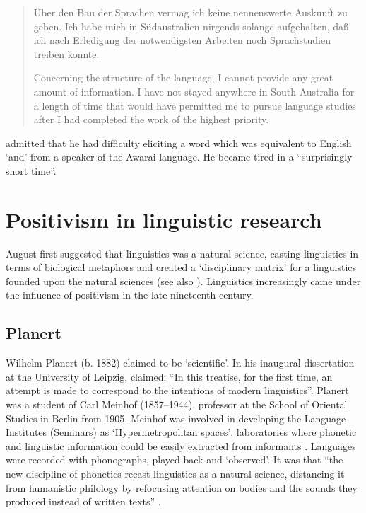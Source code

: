 \documentclass[english,output=paper,colorlinks,citecolor=brown]{../langscibook}
\begin{document}
\begin{quote}
    Über den Bau der Sprachen vermag ich keine nennenswerte Auskunft zu geben. Ich habe mich in Südaustralien nirgends solange aufgehalten, daß ich nach Erledigung der notwendigsten Arbeiten noch Sprachstudien treiben konnte. 

    Concerning the structure of the language, I cannot provide any great amount of information. I have not stayed anywhere in South Australia for a length of time that would have permitted me to pursue language studies after I had completed the work of the highest priority. \citep[81]{Eylmann1908}
\end{quote}

\citet[81]{Eylmann1908} admitted that he had difficulty eliciting a word which was equivalent to English ‘and’ from a speaker of the Awarai language. He became tired in a ``surprisingly short time''.

\section{Positivism in linguistic research}

August \citet{Schleicher1983}  first suggested that linguistics was a natural science, casting linguistics in terms of biological metaphors and created a ‘disciplinary matrix’ for a linguistics founded upon the natural sciences (see also \citealt{McElvenny2018}). Linguistics increasingly came under the influence of positivism in the late nineteenth century.

\subsection{Planert}

Wilhelm Planert (b. 1882) claimed to be ‘scientific’. In his inaugural dissertation at the University of Leipzig, \citet{Planert1907Suaheli} claimed: “In this treatise, for the first time, an attempt is made to correspond to the intentions of modern linguistics”. Planert was a student of Carl Meinhof (1857--1944), professor at the School of Oriental Studies in Berlin from 1905. Meinhof was involved in developing the Language Institutes (Seminars) as ‘Hypermetropolitan spaces’, laboratories where phonetic and linguistic information could be easily extracted from informants \citep[138]{Pugach2012}. Languages were recorded with phonographs, played back and ‘observed’. It was that “the new discipline of phonetics recast linguistics as a natural science, distancing it from humanistic philology by refocusing attention on bodies and the sounds they produced instead of written texts” \citep[93]{Pugach2012}. 
\end{document}
